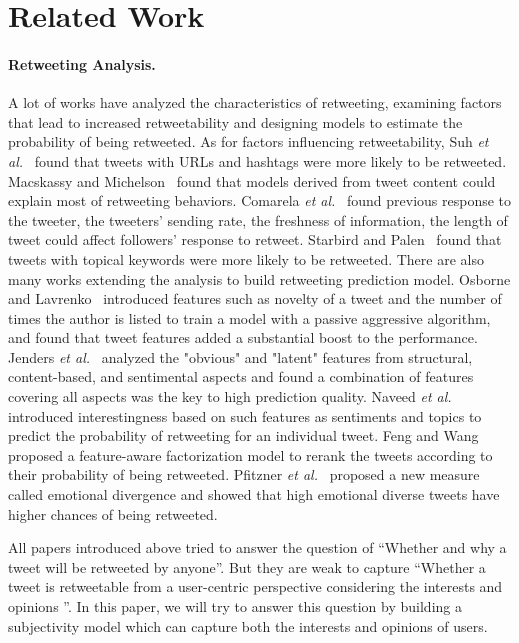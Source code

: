\documentclass[twocolumn]{svjour3}          %
\begin{document}
\section{Related Work}
\label{relatedwork}

\paragraph{Retweeting Analysis.}
A lot of works have analyzed the characteristics of retweeting, examining factors that lead to increased retweetability and designing models to estimate the probability of being retweeted. 
As for factors influencing retweetability, Suh \emph{et al.}~\cite{Suh2010} found that tweets with URLs and hashtags were more likely to be retweeted. 
Macskassy and Michelson~\cite{conf/icwsm/MacskassyM11} found that models derived from tweet content could explain most of retweeting behaviors.
Comarela \emph{et al.}~\cite{Comarela:2012UFA} found previous response to the tweeter, the tweeters’ sending rate, the freshness of information, the length of tweet could affect followers’ response to retweet. 
Starbird and Palen~\cite{Starbird:2012RRI} found that tweets with topical keywords were more likely to be retweeted. 
There are also many works extending the analysis to build retweeting prediction model. 
Osborne and Lavrenko~\cite{Osborne_Lavrenko_2011} introduced features such as novelty of a tweet and the number of times the author is listed to train a model with a passive aggressive algorithm, and found that tweet features added a substantial boost to the performance. 
Jenders \emph{et al.}~\cite{Jenders:2013APV} analyzed the "obvious" and "latent" features from structural, content-based, and sentimental aspects and found a combination of features covering all aspects was the key to high prediction quality.
Naveed \emph{et al.}~\cite{Naveed:2011SMC,2011:NaveedGKC} introduced interestingness based on such features as sentiments and topics to predict the probability of retweeting for an individual tweet.
Feng and Wang~\cite{conf/wsdm/FengW13} proposed a feature-aware factorization model to rerank the tweets according to their probability of being retweeted.
Pfitzner \emph{et al.}~\cite{conf/icwsm/PfitznerGS12} proposed a new measure called emotional divergence and showed that high emotional diverse tweets have higher chances of being retweeted.

All papers introduced above tried to answer the question of ``Whether and why a tweet will be retweeted by anyone''. 
But they are weak to capture ``Whether a tweet is retweetable from a user-centric perspective considering the interests and opinions ''. 
In this paper, we will try to answer this question by building a subjectivity model  which can capture both the interests and opinions of users.
\end{document}
